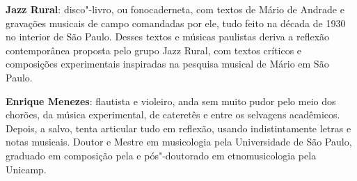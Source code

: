 \textbf{Jazz Rural}: disco"-livro, ou fonocaderneta, com textos de Mário de Andrade e gravações musicais de campo comandadas por ele, tudo feito na década de 1930 no interior de São Paulo. Desses textos e músicas paulistas deriva a reflexão contemporânea proposta pelo grupo Jazz Rural, com textos críticos e composições experimentais inspiradas na pesquisa musical de Mário em São Paulo.
        
\textbf{Enrique Menezes}: flautista e violeiro, anda sem muito pudor pelo meio dos chorões, da música experimental, de cateretês e entre os selvagens acadêmicos. Depois, a salvo, tenta articular tudo em reflexão, usando indistintamente letras e notas musicais. Doutor e Mestre em musicologia pela Universidade de São Paulo, graduado em composição pela  e pós"-doutorado em etnomusicologia pela Unicamp.

